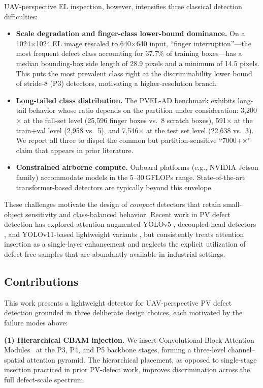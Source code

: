 \documentclass[journal,onecolumn,11pt]{IEEEtran}
\begin{document}
UAV-perspective EL inspection, however, intensifies three classical detection difficulties:
\begin{itemize}
\item \textbf{Scale degradation and finger-class lower-bound dominance.} On a 1024$\times$1024 EL image rescaled to 640$\times$640 input, ``finger interruption''---the most frequent defect class accounting for 37.7\% of training boxes---has a median bounding-box side length of 28.9 pixels and a minimum of 14.5 pixels. This puts the most prevalent class right at the discriminability lower bound of stride-8 (P3) detectors, motivating a higher-resolution branch.
\item \textbf{Long-tailed class distribution.} The PVEL-AD benchmark exhibits long-tail behavior whose ratio depends on the partition under consideration: 3{,}200$\times$ at the full-set level (25{,}596 finger boxes vs.\ 8 scratch boxes), 591$\times$ at the train+val level (2{,}958 vs.\ 5), and 7{,}546$\times$ at the test set level (22{,}638 vs.\ 3). We report all three to dispel the common but partition-sensitive ``7000+$\times$'' claim that appears in prior literature.
\item \textbf{Constrained airborne compute.} Onboard platforms (e.g., NVIDIA Jetson family) accommodate models in the 5--30\,GFLOPs range. State-of-the-art transformer-based detectors are typically beyond this envelope.
\end{itemize}

These challenges motivate the design of \emph{compact} detectors that retain small-object sensitivity and class-balanced behavior. Recent work in PV defect detection has explored attention-augmented YOLOv5 \cite{wang2023yolo5pv}, decoupled-head detectors \cite{liu2024pvdetector}, and YOLOv11-based lightweight variants \cite{aeyolo2025}, but consistently treats attention insertion as a single-layer enhancement and neglects the explicit utilization of defect-free samples that are abundantly available in industrial settings.

\subsection{Contributions}
\label{sec:contrib}
This work presents a lightweight detector for UAV-perspective PV defect detection grounded in three deliberate design choices, each motivated by the failure modes above:

\textbf{(1) Hierarchical CBAM injection.} We insert Convolutional Block Attention Modules~\cite{woo2018cbam} at the P3, P4, and P5 backbone stages, forming a three-level channel--spatial attention pyramid. The hierarchical placement, as opposed to single-stage insertion practiced in prior PV-defect work, improves discrimination across the full defect-scale spectrum.
\end{document}
